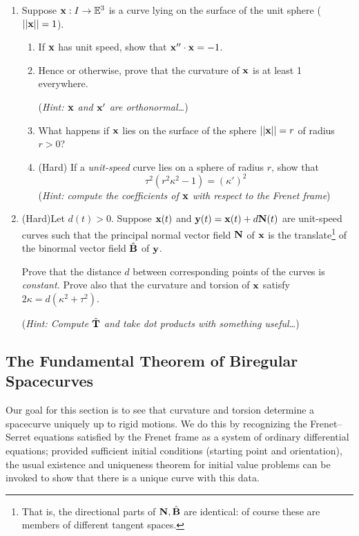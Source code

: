 \begin{exercises}
\begin{enumerate}
  \item Suppose ${\mathbf{x}}:I\to\mathbb{E}^3$ is a curve lying on the surface of the unit sphere ($\left| \left| {\mathbf{x}}\right|\right|=1$).
  \begin{enumerate}
    \item If ${\mathbf{x}}$ has unit speed, show that ${\mathbf{x}}''\cdot{\mathbf{x}}=-1$.
    \item Hence or otherwise, prove that the curvature of ${\mathbf{x}}$ is at least 1 everywhere.\par
    (\emph{Hint: ${\mathbf{x}}$ and ${\mathbf{x}}'$ are orthonormal\ldots})
    \item What happens if ${\mathbf{x}}$ lies on the surface of the sphere $\left| \left| {\mathbf{x}}\right|\right|=r$ of radius $r>0$?
    
    \item (Hard) If a \emph{unit-speed} curve lies on a sphere of radius $r$, show that
    \[\tau^2(r^2\kappa^2-1)=(\kappa')^2\]
    (\emph{Hint: compute the coefficients of ${\mathbf{x}}$ with respect to the Frenet frame})
  \end{enumerate}
  
  

	\item (Hard)\quad Let $d(t)>0$. Suppose ${\mathbf{x}}(t)$ and ${\mathbf{y}}(t)={\mathbf{x}}(t)+d{\mathbf{N}}(t)$ are unit-speed curves such that the principal normal vector field ${\mathbf{N}}$ of ${\mathbf{x}}$ is the translate\footnote{That is, the directional parts of ${\mathbf{N}},\hat{{\mathbf{B}}}$ are identical: of course these are members of different tangent spaces.} of the binormal vector field $\hat{{\mathbf{B}}}$ of ${\mathbf{y}}$.\par
	Prove that the distance $d$ between corresponding points of the curves is \emph{constant.} Prove also that the curvature and torsion of ${\mathbf{x}}$ satisfy $2\kappa=d(\kappa^2+\tau^2)$.\par
	(\emph{Hint: Compute $\hat{{\mathbf{T}}}$ and take dot products with something useful\ldots})
  
\end{enumerate}
\end{exercises}

\clearpage

\subsection{The Fundamental Theorem of Biregular Spacecurves}


Our goal for this section is to see that curvature and torsion determine a spacecurve uniquely up to rigid motions. We do this by recognizing the Frenet--Serret equations satisfied by the Frenet frame as a system of ordinary differential equations; provided sufficient initial conditions (starting point and orientation), the usual existence and uniqueness theorem for initial value problems can be invoked to show that there is a unique curve with this data.\medbreak

